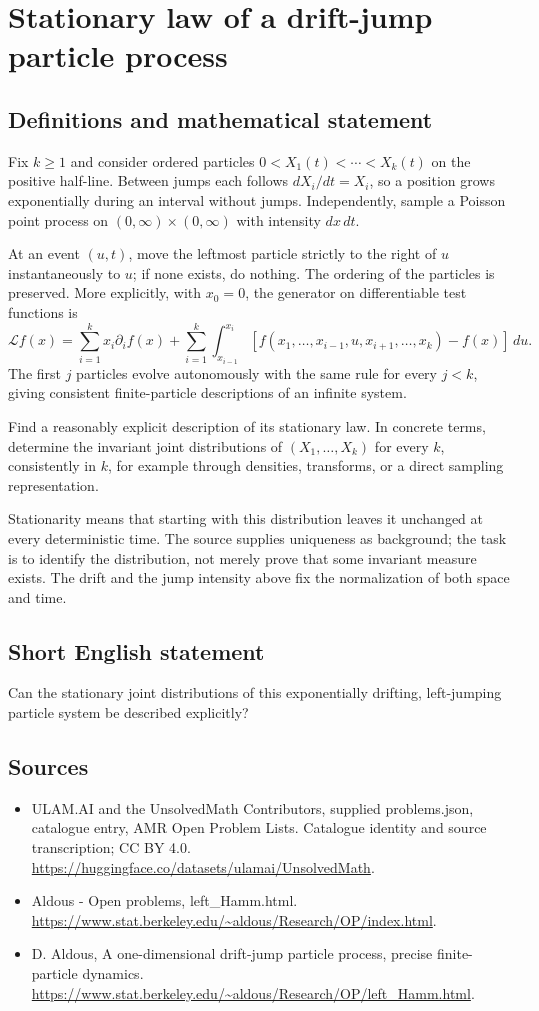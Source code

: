 \documentclass[11pt,a4paper]{article}
\begin{document}
\section*{Stationary law of a drift-jump particle process}\label{statement}

\subsection{Definitions and mathematical statement}
Fix $k\ge1$ and consider ordered particles $0<X_1(t)<\cdots<X_k(t)$ on the positive half-line. Between jumps each follows $dX_i/dt=X_i$, so a position grows exponentially during an interval without jumps. Independently, sample a Poisson point process on $(0,\infty)\times(0,\infty)$ with intensity $dx\,dt$.

At an event $(u,t)$, move the leftmost particle strictly to the right of $u$ instantaneously to $u$; if none exists, do nothing. The ordering of the particles is preserved. More explicitly, with $x_0=0$, the generator on differentiable test functions is
\[
\mathcal L f(x)=\sum_{i=1}^k x_i\partial_i f(x)
+\sum_{i=1}^k\int_{x_{i-1}}^{x_i}
[f(x_1,\ldots,x_{i-1},u,x_{i+1},\ldots,x_k)-f(x)]\,du.
\]
The first $j$ particles evolve autonomously with the same rule for every $j<k$, giving consistent finite-particle descriptions of an infinite system.

Find a reasonably explicit description of its stationary law. In concrete terms, determine the invariant joint distributions of $(X_1,\ldots,X_k)$ for every $k$, consistently in $k$, for example through densities, transforms, or a direct sampling representation.

Stationarity means that starting with this distribution leaves it unchanged at every deterministic time. The source supplies uniqueness as background; the task is to identify the distribution, not merely prove that some invariant measure exists. The drift and the jump intensity above fix the normalization of both space and time.
\subsection{Short English statement}
Can the stationary joint distributions of this exponentially drifting, left-jumping particle system be described explicitly?
\subsection{Sources}
\begin{itemize}
\item[S1] ULAM.AI and the UnsolvedMath Contributors, supplied problems.json, catalogue entry, AMR Open Problem Lists. Catalogue identity and source transcription; CC BY 4.0.
\url{https://huggingface.co/datasets/ulamai/UnsolvedMath}.
\item[S2] Aldous - Open problems, left\_Hamm.html. 
\url{https://www.stat.berkeley.edu/~aldous/Research/OP/index.html}.
\item[S3] D. Aldous, A one-dimensional drift-jump particle process, precise finite-particle dynamics.
\url{https://www.stat.berkeley.edu/~aldous/Research/OP/left_Hamm.html}.
\end{itemize}
\end{document}
